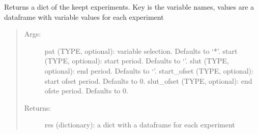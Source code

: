 \documentclass[letterpaper,10pt,english]{sphinxmanual}
\begin{document}
\begin{fulllineitems}
\begin{fulllineitems}
\end{fulllineitems}


\begin{fulllineitems}
\label{\detokenize{core/modelclass:modelclass.Display_Mixin.keep_get_dict}}
\pysigstartsignatures
{}
\pysigstopsignatures
\sphinxAtStartPar
Returns a dict of the keept experiments. Key is the variable names, values are a dataframe with variable values for each experiment
\begin{quote}
\begin{description}
\item[{Args:}] \leavevmode
\sphinxAtStartPar
pat (TYPE, optional): variable selection. Defaults to ‘*’.
start (TYPE, optional): start period. Defaults to ‘’.
slut (TYPE, optional): end period. Defaults to ‘’.
start\_ofset (TYPE, optional): start ofset period. Defaults to 0.
slut\_ofset (TYPE, optional): end ofste period. Defaults to 0.

\item[{Returns:}] \leavevmode
\sphinxAtStartPar
res (dictionary): a dict with a dataframe for each experiment

\end{description}
\end{quote}

\end{fulllineitems}



\end{fulllineitems}
\end{document}
